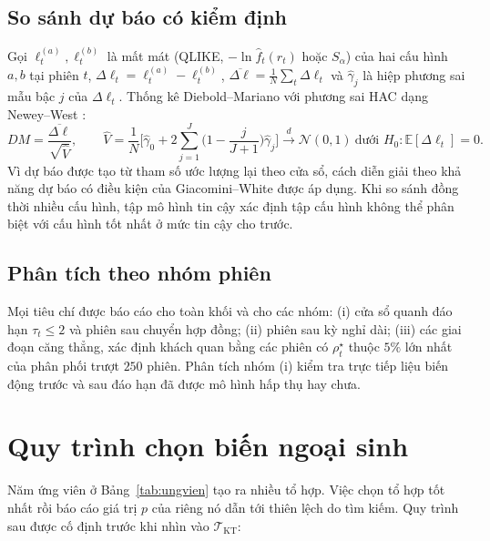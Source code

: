 \documentclass[12pt,a4paper]{article}
\theoremstyle{definition}
\theoremstyle{remark}
\newcommand{\E}{\mathbb{E}}
\begin{document}
\subsection{So sánh dự báo có kiểm định}

Gọi $\ell^{(a)}_t,\ell^{(b)}_t$ là mất mát (QLIKE, $-\ln\hat f_t(r_t)$ hoặc $S_\alpha$) của hai cấu hình $a,b$ tại phiên $t$, $\Delta\ell_t=\ell^{(a)}_t-\ell^{(b)}_t$, $\overline{\Delta\ell}=\frac1N\sum_t\Delta\ell_t$ và $\hat\gamma_j$ là hiệp phương sai mẫu bậc $j$ của $\Delta\ell_t$. Thống kê Diebold--Mariano \cite{dm1995} với phương sai HAC dạng Newey--West \cite{newey1987}:
\begin{equation}
DM=\frac{\overline{\Delta\ell}}{\sqrt{\widehat V}},\qquad
\widehat V=\frac1N\Big[\hat\gamma_0+2\sum_{j=1}^{J}\Big(1-\frac{j}{J+1}\Big)\hat\gamma_j\Big]\xrightarrow{d}\mathcal N(0,1)\ \text{dưới } H_0:\E[\Delta\ell_t]=0 .
\end{equation}
Vì dự báo được tạo từ tham số ước lượng lại theo cửa sổ, cách diễn giải theo khả năng dự báo có điều kiện của Giacomini--White \cite{giacomini2006} được áp dụng. Khi so sánh đồng thời nhiều cấu hình, tập mô hình tin cậy \cite{hln2011} xác định tập cấu hình không thể phân biệt với cấu hình tốt nhất ở mức tin cậy cho trước.

\subsection{Phân tích theo nhóm phiên}

Mọi tiêu chí được báo cáo cho toàn khối và cho các nhóm: (i) cửa sổ quanh đáo hạn $\tau_t\le2$ và phiên sau chuyển hợp đồng; (ii) phiên sau kỳ nghỉ dài; (iii) các giai đoạn căng thẳng, xác định khách quan bằng các phiên có $\rho^{\star}_t$ thuộc $5\%$ lớn nhất của phân phối trượt $250$ phiên. Phân tích nhóm (i) kiểm tra trực tiếp liệu biến động trước và sau đáo hạn đã được mô hình hấp thụ hay chưa.

\section{Quy trình chọn biến ngoại sinh}\label{sec:chonbien}

Năm ứng viên ở Bảng~\ref{tab:ungvien} tạo ra nhiều tổ hợp. Việc chọn tổ hợp tốt nhất rồi báo cáo giá trị $p$ của riêng nó dẫn tới thiên lệch do tìm kiếm. Quy trình sau được cố định trước khi nhìn vào $\mathcal T_{\mathrm{KT}}$:
\end{document}
